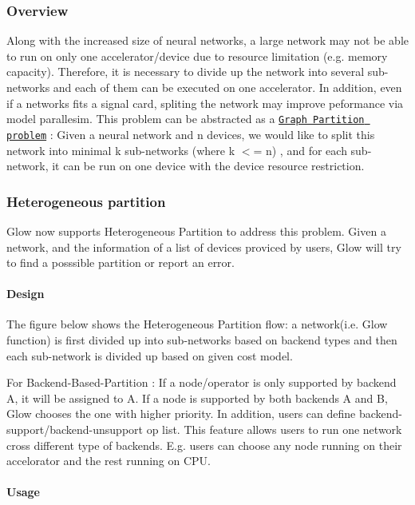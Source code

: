 \subsubsection*{Overview}

Along with the increased size of neural networks, a large network may not be able to run on only one accelerator/device due to resource limitation (e.\+g. memory capacity). Therefore, it is necessary to divide up the network into several sub-\/networks and each of them can be executed on one accelerator. In addition, even if a networks fits a signal card, spliting the network may improve peformance via model parallesim. This problem can be abstracted as a \href{https://en.wikipedia.org/wiki/Graph_partition}{\tt Graph Partition problem} \+: Given a neural network and n devices, we would like to split this network into minimal k sub-\/networks (where k $<$= n) , and for each sub-\/network, it can be run on one device with the device resource restriction.

\subsubsection*{Heterogeneous partition}

Glow now supports Heterogeneous Partition to address this problem. Given a network, and the information of a list of devices proviced by users, Glow will try to find a posssible partition or report an error.

\paragraph*{Design}

The figure below shows the Heterogeneous Partition flow\+: a network(i.\+e. Glow function) is first divided up into sub-\/networks based on backend types and then each sub-\/network is divided up based on given cost model. 

For Backend-\/\+Based-\/\+Partition \+: If a node/operator is only supported by backend A, it will be assigned to A. If a node is supported by both backends A and B, Glow chooses the one with higher priority. In addition, users can define backend-\/support/backend-\/unsupport op list. This feature allows users to run one network cross different type of backends. E.\+g. users can choose any node running on their accelorator and the rest running on C\+PU.

\paragraph*{Usage}


